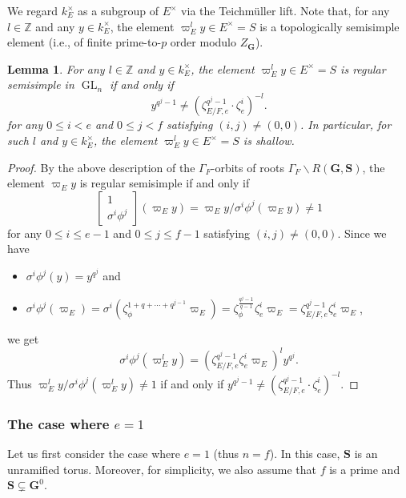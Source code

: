 \documentclass{amsart}
\newcommand{\Z}{\mathbb{Z}}
\newcommand{\bfG}{\mathbf{G}}
\newcommand{\bfS}{\mathbf{S}}
\DeclareMathOperator{\GL}{GL}
\theoremstyle{plain}
\newtheorem{lem}[thm]{Lemma}
\theoremstyle{definition}
\theoremstyle{remark}
\theoremstyle{theorem}
\begin{document}
We regard $k_{E}^{\times}$ as a subgroup of $E^{\times}$ via the Teichm\"uller lift.
Note that, for any $l\in\Z$ and any $y\in k_{E}^{\times}$, the element $\varpi_{E}^{l}y\in E^{\times}=S$ is a topologically semisimple element (i.e., of finite prime-to-$p$ order modulo $Z_{\bfG}$).

\begin{lem}\label{lem:A1}
For any $l\in\Z$ and $y\in k_{E}^{\times}$, the element $\varpi_{E}^{l}y\in E^{\times}=S$ is regular semisimple in $\GL_{n}$ if and only if
\[\label{A1}
y^{q^{j}-1}\neq (\zeta_{E/F,e}^{q^{j}-1}\cdot\zeta_{e}^{i})^{-l}.
\tag{$\ast$}
\]
for any $0\leq i<e$ and $0\leq j<f$ satisfying $(i,j)\neq(0,0)$.
In particular, for such $l$ and $y\in k_{E}^{\times}$, the element $\varpi_{E}^{l}y\in E^{\times}=S$ is shallow.
\end{lem}

\begin{proof}
By the above description of the $\Gamma_{F}$-orbits of roots $\Gamma_{F}\backslash R(\bfG,\bfS)$, the element $\varpi_{E}y$ is regular semisimple if and only if 
\[
\begin{bmatrix}1\\\sigma^{i}\phi^{j}\end{bmatrix}(\varpi_{E}y)=\varpi_{E}y/\sigma^{i}\phi^{j}(\varpi_{E}y)\neq1
\]
for any $0\leq i\leq e-1$ and $0\leq j\leq f-1$ satisfying $(i,j)\neq(0,0)$.
Since we have
\begin{itemize}
\item
$\sigma^{i}\phi^{j}(y)=y^{q^{j}}$ and
\item
$\sigma^{i}\phi^{j}(\varpi_{E})=\sigma^{i}(\zeta_{\phi}^{1+q+\cdots+q^{j-1}}\varpi_{E})=\zeta_{\phi}^{\frac{q^{j}-1}{q-1}}\zeta_{e}^{i}\varpi_{E}=\zeta_{E/F,e}^{q^{j}-1}\zeta_{e}^{i}\varpi_{E}$,
\end{itemize}
we get 
\[
\sigma^{i}\phi^{j}(\varpi_{E}^{l}y)
=(\zeta_{E/F,e}^{q^{j}-1}\zeta_{e}^{i}\varpi_{E})^{l}y^{q^{j}}.
\]
Thus $\varpi_{E}^{l}y/\sigma^{i}\phi^{j}(\varpi_{E}^{l}y)\neq1$ if and only if $y^{q^{j}-1}\neq (\zeta_{E/F,e}^{q^{j}-1}\cdot\zeta_{e}^{i})^{-l}$.
\end{proof}


\subsubsection{The case where $e=1$}\label{subsubsec:e=1}
Let us first consider the case where $e=1$ (thus $n=f$).
In this case, $\bfS$ is an unramified torus.
Moreover, for simplicity, we also assume that $f$ is a prime and $\bfS\subsetneq\bfG^{0}$.
\end{document}
